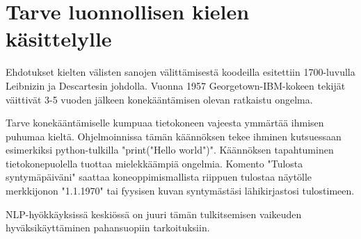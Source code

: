 \chapter{Tarve luonnollisen kielen käsittelylle\label{methods}}

Ehdotukset kielten välisten sanojen välittämisestä koodeilla esitettiin 1700-luvulla Leibnizin ja Descartesin johdolla. Vuonna 1957 Georgetown-IBM-kokeen tekijät väittivät 3-5 vuoden jälkeen konekääntämisen olevan ratkaistu ongelma.

Tarve konekääntämiselle kumpuaa tietokoneen vajeesta ymmärtää ihmisen puhumaa kieltä. Ohjelmoinnissa tämän käännöksen tekee ihminen kutsuessaan esimerkiksi python-tulkilla "print("Hello world")". Käännöksen tapahtuminen tietokonepuolella tuottaa mielekkäämpiä ongelmia. Komento "Tulosta syntymäpäiväni" saattaa koneoppimismallista riippuen tulostaa näytölle merkkijonon "1.1.1970" tai fyysisen kuvan syntymästäsi lähikirjastosi tulostimeen.

NLP-hyökkäyksissä keskiössä on juuri tämän tulkitsemisen vaikeuden hyväksikäyttäminen pahansuopiin tarkoituksiin.